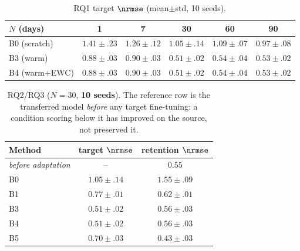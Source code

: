 
\begin{table}[t]
\centering
\caption{RQ1 target $\nrmse$ (mean$\pm$std, 10 seeds).}
\label{tab:rq1}
\begin{tabular}{lccccc}
\toprule
$N$ (days) & 1 & 7 & 30 & 60 & 90\\
\midrule
B0 (scratch)   & $1.41\pm.23$ & $1.26\pm.12$ & $1.05\pm.14$ & $1.09\pm.07$ & $0.97\pm.08$\\
B3 (warm)      & $0.88\pm.03$ & $0.90\pm.03$ & $0.51\pm.02$ & $0.54\pm.04$ & $0.53\pm.02$\\
B4 (warm+EWC)  & $0.88\pm.03$ & $0.90\pm.03$ & $0.51\pm.02$ & $0.54\pm.04$ & $0.53\pm.02$\\
\bottomrule
\end{tabular}
\end{table}

\begin{table}[t]
\centering
\caption{RQ2/RQ3 ($N{=}30$, \textbf{10 seeds}). The reference row is the transferred model \emph{before} any target fine-tuning: a condition scoring below it has improved on the source, not preserved it.}
\label{tab:rq2}
\begin{tabular}{lcc}
\toprule
Method & target $\nrmse$ & retention $\nrmse$\\
\midrule
\emph{before adaptation} & -- & $\mathit{0.55}$\\
\midrule
B0 & $1.05\pm.14$ & $1.55\pm.09$\\
B1 & $0.77\pm.01$ & $0.62\pm.01$\\
B3 & $0.51\pm.02$ & $0.56\pm.03$\\
B4 & $0.51\pm.02$ & $0.56\pm.03$\\
B5 & $0.70\pm.03$ & $0.43\pm.03$\\
\bottomrule
\end{tabular}
\end{table}

